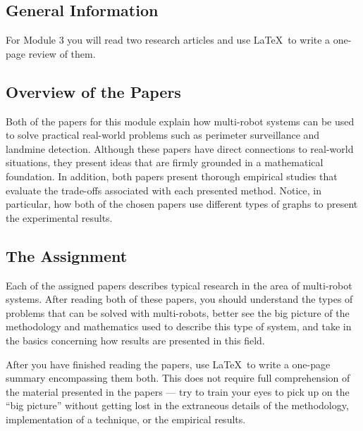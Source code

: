 

\usepackage[compact]{titlesec}




\subsection*{General Information}

For Module 3 you will read two research articles and use \LaTeX\ to write a one-page review of them.

\subsection*{Overview of the Papers}

Both of the papers for this module explain how multi-robot systems can be used to solve practical real-world problems
such as perimeter surveillance and landmine detection. Although these papers have direct connections to real-world
situations, they present ideas that are firmly grounded in a mathematical foundation. In addition, both papers present
thorough empirical studies that evaluate the trade-offs associated with each presented method. Notice, in particular,
how both of the chosen papers use different types of graphs to present the experimental results.

\subsection*{The Assignment}

  Each of the assigned papers describes typical research in the area of multi-robot systems. After reading both of these
  papers, you should understand the types of problems that can be solved with multi-robots, better see the big picture
  of the methodology and mathematics used to describe this type of system, and take in the basics concerning how
  results are presented in this field.

  After you have finished reading the papers, use \LaTeX\ to write a one-page summary encompassing them both.  This does
  not require full comprehension of the material presented in the papers --- try to train your eyes to pick up on the
  ``big picture'' without getting lost in the extraneous details of the methodology, implementation of a technique, or
  the empirical results.

